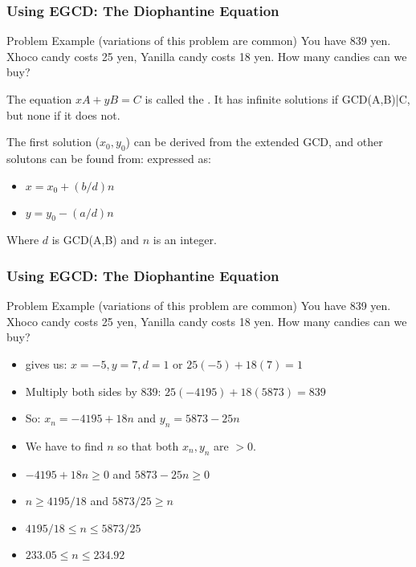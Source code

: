 \documentclass{beamer}
\begin{document}
\begin{frame}
  \frametitle{Using EGCD: The Diophantine Equation}
  {\smaller
    \begin{block}{Problem Example (variations of this problem are common)}
      You have 839 yen. \alert{X}hoco candy costs 25 yen,
      \alert{Y}anilla candy costs 18 yen. How many candies can we buy?
    \end{block}

    \bigskip

    The equation $xA+yB=C$ is called the . It has infinite solutions if GCD(A,B)|C, but none if
    it does not.

    \bigskip   

    The first solution ($x_0,y_0$) can be derived from the extended
    GCD, and other solutons can be found from:
    expressed as:
    \begin{itemize}
    \item $x = x_0 + (b/d)n$
    \item $y = y_0 - (a/d)n$
    \end{itemize}
    Where $d$ is GCD(A,B) and $n$ is an integer.
  }
\end{frame}

\begin{frame}
  \frametitle{Using EGCD: The Diophantine Equation}
  {\smaller
    \begin{block}{Problem Example (variations of this problem are common)}
      You have 839 yen. \alert{X}hoco candy costs 25 yen,
      \alert{Y}anilla candy costs 18 yen. How many candies can we buy?
    \end{block}
   
    \begin{itemize}
    \item {} gives us: $x=-5, y=7, d=1$ or $25(-5)+18(7) = 1$
    \item Multiply both sides by 839: $25(-4195)+18(5873) = 839$
    \item So: $x_n = -4195 + 18n$ and $y_n = 5873 - 25n$
    \item We have to find $n$ so that both $x_n,y_n$ are $> 0$.
    \item $-4195 + 18n \geq 0$ and $5873 - 25n \geq 0$
    \item $n \geq 4195/18$ and $5873/25 \geq n$
    \item $4195/18 \leq n \leq 5873/25$
    \item $233.05 \leq n \leq 234.92$
    \end{itemize} 
  }
\end{frame}
\end{document}
